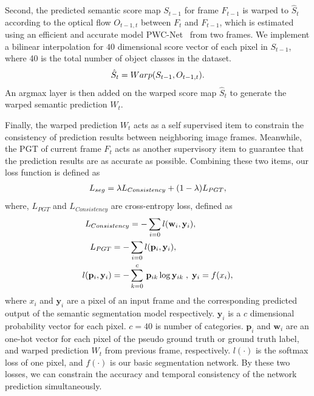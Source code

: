 Second, the predicted semantic score map $S_{t-1}$ for frame $F_{t-1}$ is warped to $\hat{S}_{t}$ according to the optical flow $O_{t-1,t}$ between $F_t$ and $F_{t-1}$, which is estimated using an efficient and accurate model PWC-Net~\cite{Sun2018} from two frames. 
We implement a bilinear interpolation for $40$ dimensional score vector of each pixel in $S_{t-1}$, where 40 is the total number of object classes in the dataset. 
\begin{equation}
\centering
\hat{S}_{t}=Warp(S_{t-1},O_{t-1,t}).
\end{equation}
%
An argmax layer is then added on the warped score map ${\hat{S}_{t}}$ to generate the warped semantic prediction $W_{t}$.

Finally, the warped prediction $W_{t}$ acts as a self supervised item to constrain the consistency of prediction results between neighboring image frames.
%
Meanwhile, the PGT of current frame $F_t$ acts as another supervisory item to guarantee that the prediction results are as accurate as possible.
Combining these two items, our loss function is defined as
\begin{equation}
\centering
\begin{aligned}
L_{seg}= \lambda L_{Consistency} +(1-\lambda)L_{PGT},
\end{aligned}
\end{equation}
%
where, ${L_{PGT}}$ and ${L_{Consistency}}$ are cross-entropy loss, defined as
\begin{equation}
{
\vspace*{-0.6cm} 
\centering     
\begin{aligned} 
L_{Consistency} &= -\sum_{i=0} l(\mathbf{w}_i,\mathbf{y}_i),\\
L_{PGT} = -&\sum_{i=0} l(\mathbf{p}_i,\mathbf{y}_i), \\
l(\mathbf{p}_i,\mathbf{y}_i) = -&\sum_{k=0}^c \,\mathbf{p}_{ik}\log{\mathbf{y}_{ik}}\;,\; \mathbf{y}_{i} = f(x_{i}),\\
\end{aligned}
}
\end{equation}
%
where ${x_i}$ and ${\mathbf{y}_i}$ are a pixel of an input frame and the corresponding predicted output of the semantic segmentation model respectively. 
%
$\mathbf{y}_i$ is a $c$ dimensional probability vector for each pixel.
${c}=40$ is number of categories.
%
${\mathbf{p}_i}$ and ${\mathbf{w}_i}$ are an one-hot vector for each pixel of the pseudo ground truth or ground truth label, and warped prediction $W_{t}$ from previous frame, respectively. 
%
${l(\cdot)}$ is the softmax loss of one pixel, and ${f(\cdot)}$ is our basic segmentation network. 
%
By these two losses, we can constrain the accuracy and temporal consistency of the network prediction simultaneously.
